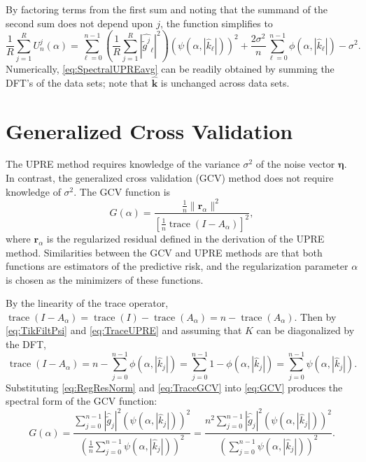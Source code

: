 \documentclass[12pt,notitlepage]{report}
\newcommand{\gnoise}{\widetilde{g}}	%
\newcommand{\kVec}{\mathbf{k}}	%
\newcommand{\kMat}{K}	%
\DeclareMathOperator{\trace}{trace}		%
\newcommand{\regparam}{\alpha}
\newcommand{\filt}{\phi}
\newcommand{\mfilt}{\psi}
\newcommand{\noise}{\eta}	%
\newcommand{\noiseSD}{\sigma}	%
\newcommand{\noiseVec}{\bm{\noise}}	%
\newcommand{\regres}{\mathbf{r}_{\regparam}}	%
\newcommand{\A}{A_{\regparam}}	%
\newcommand{\U}{U}	%
\newcommand{\GCV}{G}	%
\begin{document}
By factoring terms from the first sum and noting that the summand of the second sum does not depend upon $j$, the function simplifies to
\begin{equation}
\frac{1}{R}\sum_{j=1}^R \U_n^j(\regparam) =  \sum_{\ell = 0}^{n-1} \left(\frac{1}{R}\sum_{j=1}^R |\widehat{\gnoise^j}_\ell|^2\right)(\mfilt(\regparam,|\widehat{k}_\ell|))^2 + \frac{2\noiseSD^2}{n}\sum_{\ell = 0}^{n-1} \filt(\regparam,|\widehat{k}_\ell|) - \noiseSD^2.
\label{eq:SpectralUPREavg}
\end{equation}
Numerically, \eqref{eq:SpectralUPREavg} can be readily obtained by summing the DFT's of the data sets; note that $\widehat{\kVec}$ is unchanged across data sets.

\section{Generalized Cross Validation} \label{sec:Generalized Cross Validation}
The UPRE method requires knowledge of the variance $\noiseSD^2$ of the noise vector $\noiseVec$. In contrast, the generalized cross validation (GCV) method \cite{Wahba1977,Wahba1990} does not require knowledge of $\noiseSD^2$. The GCV function is
\begin{equation}
\label{eq:GCV}
\GCV(\regparam) = \frac{\frac{1}{n}\|\regres\|^2}{\left[\frac{1}{n}\trace(I-\A)\right]^2},
\end{equation}
where $\regres$ is the regularized residual defined in the derivation of the UPRE method. Similarities between the GCV and UPRE methods are that both functions are estimators of the predictive risk, and the regularization parameter $\regparam$ is chosen as the minimizers of these functions. \par 
By the linearity of the trace operator, $\trace(I-\A) = \trace(I)-\trace(\A) = n - \trace(\A)$. Then by \eqref{eq:TikFiltPsi} and \eqref{eq:TraceUPRE} and assuming that $\kMat$ can be diagonalized by the DFT,
\begin{equation}
\trace(I-\A) = n - \sum_{j = 0}^{n-1} \filt(\regparam,|\widehat{k}_j|) = \sum_{j = 0}^{n-1} 1 - \filt(\regparam,|\widehat{k}_j|) = \sum_{j = 0}^{n-1} \mfilt(\regparam,|\widehat{k}_j|).
\label{eq:TraceGCV}
\end{equation}
Substituting \eqref{eq:RegResNorm} and \eqref{eq:TraceGCV} into \eqref{eq:GCV} produces the spectral form of the GCV function:
\begin{equation}
\GCV(\regparam) = \frac{\sum_{j = 0}^{n-1} |\widehat{\gnoise}_j|^2(\mfilt(\regparam,|\widehat{k}_j|))^2}{(\frac{1}{n}\sum_{j = 0}^{n-1} \mfilt(\regparam,|\widehat{k}_j|))^2} = \frac{n^2\sum_{j = 0}^{n-1} |\widehat{\gnoise}_j|^2(\mfilt(\regparam,|\widehat{k}_j|))^2}{(\sum_{j = 0}^{n-1} \mfilt(\regparam,|\widehat{k}_j|))^2}.
\label{eq:SpectralGCV}
\end{equation}
\end{document}
